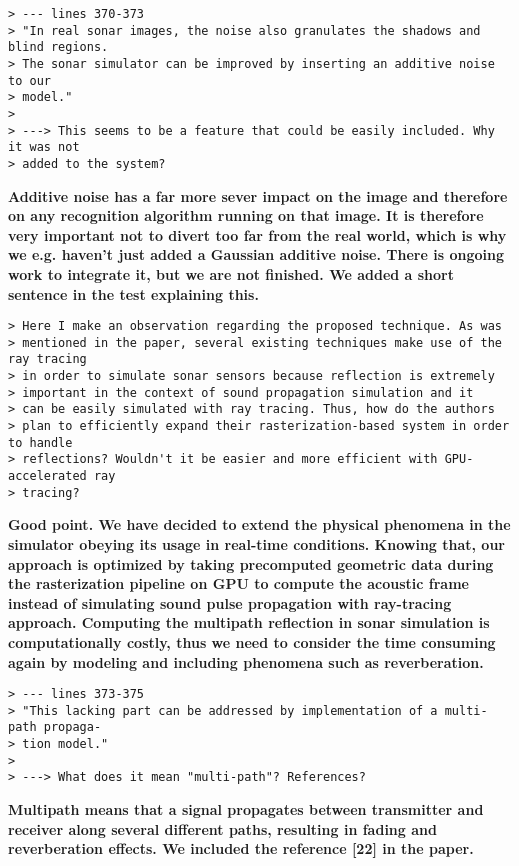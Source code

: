 \documentclass{article}
\begin{document}
\begin{verbatim}
> --- lines 370-373
> "In real sonar images, the noise also granulates the shadows and blind regions.
> The sonar simulator can be improved by inserting an additive noise to our
> model."
>
> ---> This seems to be a feature that could be easily included. Why it was not
> added to the system?

\end{verbatim}

\textbf{Additive noise has a far more sever impact on the image and therefore on any recognition
algorithm running on that image. It is therefore very important not to divert too far from the real world,
which is why we e.g. haven't just added a Gaussian additive noise. There is ongoing work to integrate it,
but we are not finished. We added a short sentence in the test explaining this.}

\begin{verbatim}
> Here I make an observation regarding the proposed technique. As was
> mentioned in the paper, several existing techniques make use of the ray tracing
> in order to simulate sonar sensors because reflection is extremely
> important in the context of sound propagation simulation and it
> can be easily simulated with ray tracing. Thus, how do the authors
> plan to efficiently expand their rasterization-based system in order to handle
> reflections? Wouldn't it be easier and more efficient with GPU-accelerated ray
> tracing?
\end{verbatim}

\textbf{Good point. We have decided to extend the physical phenomena in the
simulator obeying its usage in real-time conditions. Knowing that, our approach
is optimized by taking precomputed geometric data during the rasterization
pipeline on GPU to compute the acoustic frame instead of simulating sound pulse propagation
with ray-tracing approach. Computing the multipath reflection in sonar simulation
is computationally costly, thus we need to consider the time consuming again by modeling
and including phenomena such as reverberation.}

\begin{verbatim}
> --- lines 373-375
> "This lacking part can be addressed by implementation of a multi-path propaga-
> tion model."
>
> ---> What does it mean "multi-path"? References?
\end{verbatim}

\textbf{Multipath means that a signal propagates between transmitter and receiver along
several different paths, resulting in fading and reverberation effects. We included
the reference [22] in the paper.}
\end{document}
